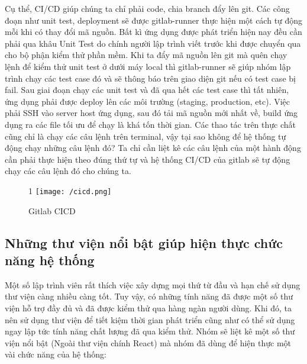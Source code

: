 		Cụ thể, CI/CD giúp chúng ta chỉ phải code, chia branch đẩy lên git. Các công đoạn như unit test, deployment sẽ được gitlab-runner thực hiện một cách tự động mỗi khi có thay đổi mã nguồn. Bất kì ứng dụng được phát triển hiện nay đều cần phải qua khâu Unit Test do chính người lập trình viết trước khi được chuyển qua cho bộ phận kiểm thử phần mềm. Khi ta đẩy mã nguồn lên git mà quên chạy lệnh để kiểm thử unit test ở dưới máy local thì gitlab-runner sẽ giúp nhóm lập trình chạy các test case đó và sẽ thông báo trên giao diện git nếu có test case bị fail. Sau giai đoạn chạy các unit test và đã qua hết các test case thì tất nhiên, ứng dụng phải được deploy lên các môi trường (staging, production, etc). Việc phải SSH vào server host ứng dụng, sau đó tải mã nguồn mới nhất về, build ứng dụng ra các file tối ưu để chạy là khá tốn thời gian. Các thao tác trên thực chất cũng chỉ là chạy các câu lệnh trên terminal, vậy tại sao không để hệ thống tự động chạy những câu lệnh đó? Ta chỉ cần liệt kê các câu lệnh của một hành động cần phải thực hiện theo đúng thứ tự và hệ thống CI/CD của gitlab sẽ tự động chạy các câu lệnh đó cho chúng ta.
		
		\begin{figure}[!ht]
1			\texttt{[image: /cicd.png]}
			\centering
			\linebreak
			\caption{Gitlab CICD}
		\end{figure}
	
		\subsection{Những thư viện nổi bật giúp hiện thực chức năng hệ thống}
			Một số lập trình viên rất thích việc xây dựng mọi thứ từ đầu và hạn chế sử dụng thư viện càng nhiều càng tốt. Tuy vậy, có những tính năng đã được một số thư viện hỗ trợ đầy đủ và đã được kiểm thử qua hàng ngàn người dùng. Khi đó, ta nên sử dụng thư viện để tiết kiệm thời gian phát triển cũng như có thể sử dụng ngay lập tức tính năng chất lượng đã qua kiểm thử. Nhóm sẽ liệt kê một số thư viện nổi bật (Ngoài thư viện chính React) mà nhóm đã dùng để hiện thực một vài chức năng của hệ thống: \\
			

